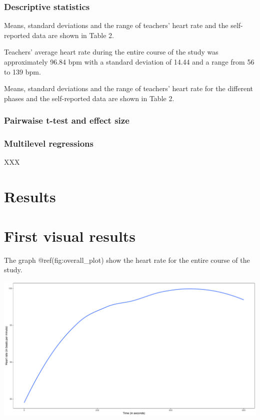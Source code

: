 \documentclass[
  man,floatsintext]{apa6}
\begin{document}
\hypertarget{descriptive-statistics}{%
\subsubsection{Descriptive statistics}\label{descriptive-statistics}}

Means, standard deviations and the range of teachers' heart rate and the self-reported data are shown in Table 2.

Teachers' average heart rate during the entire course of the study was approximately 96.84 bpm with a standard deviation of 14.44 and a range from 56 to 139 bpm.

Means, standard deviations and the range of teachers' heart rate for the different phases and the self-reported data are shown in Table 2.

\hypertarget{pairwaise-t-test-and-effect-size}{%
\subsubsection{Pairwaise t-test and effect size}\label{pairwaise-t-test-and-effect-size}}

\hypertarget{multilevel-regressions}{%
\subsubsection{Multilevel regressions}\label{multilevel-regressions}}

XXX

\hypertarget{results}{%
\section{Results}\label{results}}

\hypertarget{first-visual-results}{%
\section{First visual results}\label{first-visual-results}}

The graph @ref(fig:overall\_plot) show the heart rate for the entire course of the study.

\includegraphics{fitbit_paper_files/figure-latex/overall_plot-1.pdf}
\end{document}
